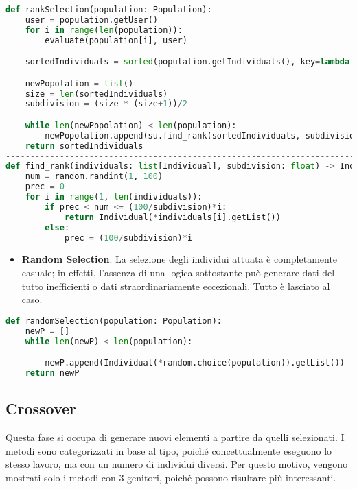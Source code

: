 \documentclass{article}
\begin{document}
\begin{lstlisting}[language=Python]
def rankSelection(population: Population):
    user = population.getUser()
    for i in range(len(population)):
        evaluate(population[i], user)

    sortedIndividuals = sorted(population.getIndividuals(), key=lambda ind: ind.fitness())

    newPopolation = list()
    size = len(sortedIndividuals)
    subdivision = (size * (size+1))/2

    while len(newPopolation) < len(population):
        newPopolation.append(su.find_rank(sortedIndividuals, subdivision))
    return sortedIndividuals
---------------------------------------------------------------------------------------
def find_rank(individuals: list[Individual], subdivision: float) -> Individual:
    num = random.randint(1, 100)
    prec = 0
    for i in range(1, len(individuals)):
        if prec < num <= (100/subdivision)*i:
            return Individual(*individuals[i].getList())
        else:
            prec = (100/subdivision)*i
\end{lstlisting}

\pagebreak

\begin{itemize}

\item\textbf{Random Selection}: La selezione degli individui attuata è completamente casuale; in effetti, l'assenza di una logica sottostante può generare dati del tutto inefficienti o dati straordinariamente eccezionali. Tutto è lasciato al caso.

\end{itemize}

\begin{lstlisting}[language=Python]
def randomSelection(population: Population):
    newP = []
    while len(newP) < len(population):

        newP.append(Individual(*random.choice(population)).getList())
    return newP
        \end{lstlisting}

\subsection{Crossover}

Questa fase si occupa di generare nuovi elementi a partire da quelli selezionati. I metodi sono categorizzati in base al tipo, poiché concettualmente eseguono lo stesso lavoro, ma con un numero di individui diversi. Per questo motivo, vengono mostrati solo i metodi con 3 genitori, poiché possono risultare più interessanti.
\end{document}
